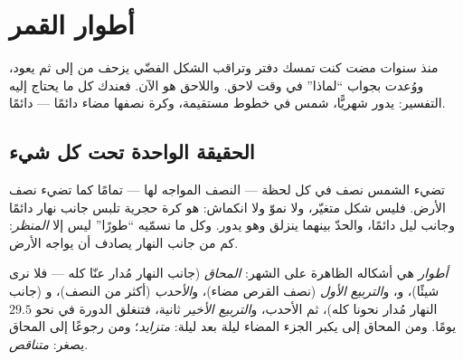\chapter{أطوار القمر}\label{ch:g7:moon-phases}

منذ سنوات مضت كنت تمسك دفتر  وتراقب الشكل الفضّي يزحف من
 إلى  ثم يعود، ووُعدت بجواب ``لماذا'' في وقت لاحق.
واللاحق هو الآن. فعندك كل ما يحتاج إليه التفسير:  يدور
شهريًّا،  شمس في خطوط مستقيمة، وكرة نصفها مضاء دائمًا ---
دائمًا.

\section{الحقيقة الواحدة تحت كل شيء}

\begin{proposition}\label{prop:g7:moon-phases:halflit}
تضيء الشمس نصف  في كل لحظة --- النصف المواجه لها ---
تمامًا كما تضيء نصف الأرض. فليس  شكل متغيّر، ولا نموّ ولا
انكماش: هو كرة حجرية تلبس جانب نهار دائمًا وجانب ليل دائمًا،
والحدّ بينهما ينزلق وهو يدور. وكل ما نسمّيه ``طورًا'' ليس إلا
\emph{المنظر}: كم من جانب النهار يصادف أن يواجه الأرض.
\end{proposition}

\begin{definition}[الأطوار]\label{def:g7:moon-phases:phases}
\emph{أطوار}  هي أشكاله الظاهرة على  الشهر:
\emph{المحاق} (جانب النهار مُدار عنّا كله --- فلا نرى شيئًا)،
و\emph{}، و\emph{التربيع الأول} (نصف القرص مضاء)،
و\emph{الأحدب} (أكثر من النصف)، و\emph{} (جانب النهار
مُدار نحونا كله)، ثم الأحدب، و\emph{التربيع الأخير} 
ثانية، فتنغلق الدورة في نحو $29.5$ يومًا. ومن المحاق إلى 
يكبر الجزء المضاء ليلة بعد ليلة:  \emph{متزايد}؛
ومن  رجوعًا إلى المحاق يصغر: \emph{متناقص}.
\end{definition}

